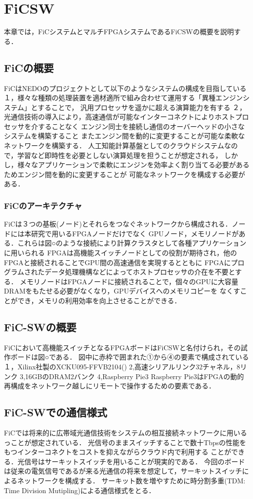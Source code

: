 \chapter{FiCSW}
{
\label{chap:ficsw}
本章では，FiCシステムとマルチFPGAシステムであるFiCSWの概要を説明する．

\section{FiCの概要}
\label{sec:about_fic}
FiCはNEDOのプロジェクトとして以下のようなシステムの構成を目指している
１，様々な種類の処理装置を適材適所で組み合わせて運用する「異種エンジンシステム」とすることで，
汎用プロセッサを遥かに超える演算能力を有する
２，光通信技術の導入により，高速通信が可能なインターコネクトによりホストプロセッサを介することなく
エンジン同士を接続し通信のオーバーヘッドの小さなシステムを構築すること
またエンジン間を動的に変更することが可能な柔軟なネットワークを構築する．
人工知能計算基盤としてのクラウドシステムなので，学習など即時性を必要としない演算処理を担うことが想定される，
しかし，様々なアプリケーションで柔軟にエンジンを効率よく割り当てる必要があるためエンジン間を動的に変更することが
可能なネットワークを構成する必要がある．
\subsection{FiCのアーキテクチャ}
\label{subsec:arch_fic}
FiCは３つの基板(ノード)とそれらをつなぐネットワークから構成される．ノードには本研究で用いるFPGAノードだけでなく
GPUノード，メモリノードがある．これらは図○のような接続により計算クラスタとして各種アプリケーションに用いられる
FPGAは高機能スイッチノードとしての役割が期待され，他のFPGAと接続されることでGPU間の高速通信を実現するとともに
FPGAにプログラムされたデータ処理機構などによってホストプロセッサの介在を不要とする．
メモリノードはFPGAノードに接続されることで，個々のGPUに大容量DRAMをもたせる必要がなくなり，GPUデバイスへのメモリコピーを
なくすことができ，メモリの利用効率を向上させることができる．
\section{FiC-SWの概要}
\label{sec:about_ficsw}
FiCにおいて高機能スイッチとなるFPGAボードはFiCSWと名付けられ，その試作ボードは図○である．
図中に赤枠で囲まれた①から④の要素で構成されている
１，Xilinx社製のXCKU095-FFVB2104()
2,高速シリアルリンク32チャネル，8リンク
3,16GBのDRAM2バンク
4,Raspberry Pie3
Raspberry Pie3はFPGAの動的再構成をネットワーク越しにリモートで操作するための要素である．
\section{FiC-SWでの通信様式}
\label{sec:ficsw_communication}
FiCでは将来的に広帯域光通信技術をシステムの相互接続ネットワークに用いるっことが想定されている．
光信号のままスイッチすることで数十Tbpsの性能をもつインターコネクトをコストを抑えながらクラウド内で利用する
ことができる．光信号はサーキットスイッチを用いることが現実的である．
今回のボードは従来の電気信号であるが来る光通信の将来を想定して，サーキットスイッチによるネットワークを構成する．
サーキット数を増やすために時分割多重(TDM: Time Division Mutipling)による通信様式をとる．


}
